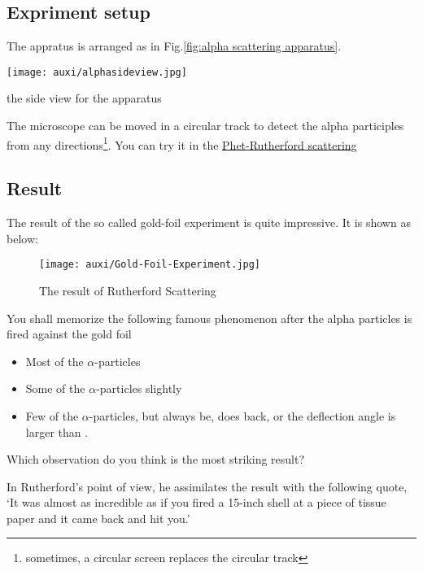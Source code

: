 \documentclass[a4paper]{tufte-handout}
\newenvironment{SummBox}
{\begin{tcolorbox}[breakable,colback=r1!30,colframe=r1,title=Summary]} {\end{tcolorbox}}
\begin{document}
\subsection{Expriment setup}
The appratus is arranged as in Fig.\ref{fig:alpha scattering apparatus}. 
\begin{marginfigure}
\centering
\texttt{[image: auxi/alphasideview.jpg]}
\caption{the side view for the apparatus}
\label{fig:alpha scattering apparatus}
\end{marginfigure}

The microscope can be moved in a circular track to detect the alpha participles from any directions\footnote{sometimes, a circular screen replaces the circular track}. You can try it in the \href{https://phet.colorado.edu/sims/html/rutherford-scattering/latest/rutherford-scattering_en.html}{Phet-Rutherford scattering}

\subsection{Result}
The result of the so called gold-foil experiment is quite impressive. It is shown as below:
\begin{figure}[h]
\centering
\texttt{[image: auxi/Gold-Foil-Experiment.jpg]}
\caption{The result of Rutherford Scattering}
\label{fig:result}
\end{figure}

\begin{SummBox}
You shall memorize the following famous phenomenon after the alpha particles is fired against the gold foil
\begin{itemize}
  \setlength\itemsep{1em}
  \item Most of the $\alpha$-particles \uline{\phantom{went through the foil without any deflection}}
  \item Some of the $\alpha$-particles \uline{\phantom{were deflected}} slightly
  \item Few of the $\alpha$-particles, but always be, does \uline{\phantom{bounce}} back, or the deflection angle is larger than \uline{\hspace{5em}}.
\end{itemize}
\end{SummBox}

Which observation do you think is the most striking result?

In Rutherford's point of view, he assimilates the result with the following quote, `It was almost as incredible as if you fired a 15-inch shell at a piece of tissue paper and it came back and hit you.'
\end{document}
